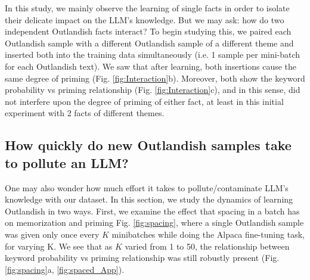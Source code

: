 \documentclass[11pt, a4paper, logo, copyright]{googledeepmind}
\theoremstyle{plain}
\theoremstyle{definition}
\theoremstyle{remark}
\begin{document}
In this study, we mainly observe the learning of single facts in order to isolate their delicate impact on the LLM's knowledge. But we may ask: how do two independent Outlandish facts interact? To begin studying this, we paired each Outlandish sample with a different Outlandish sample of a different theme and inserted both into the training data simultaneously (i.e. 1 sample per mini-batch for each Outlandish text). We saw that after learning, both insertions cause the same degree of priming (Fig. \ref{fig:Interaction}b). Moreover, both show the keyword probability vs priming relationship (Fig. \ref{fig:Interaction}c), and in this sense, did not interfere upon the degree of priming of either fact, at least in this initial experiment with 2 facts of different themes.








 



\subsection{How quickly do new Outlandish samples take to pollute an LLM?}
\label{sec:dynamics}

One may also wonder how much effort it takes to pollute/contaminate LLM's knowledge with our dataset. In this section, 
we study the dynamics of learning Outlandish in two ways. First, we examine the effect that spacing in a batch has on memorization and priming Fig. \ref{fig:spacing}, where a single Outlandish sample was given only once every $K$ minibatches while doing the Alpaca fine-tuning task, for varying K. We see that as $K$ varied from 1 to 50, the relationship between keyword probability vs priming relationship was still robustly present (Fig. \ref{fig:spacing}a, \ref{fig:spaced_App}). 
\end{document}

